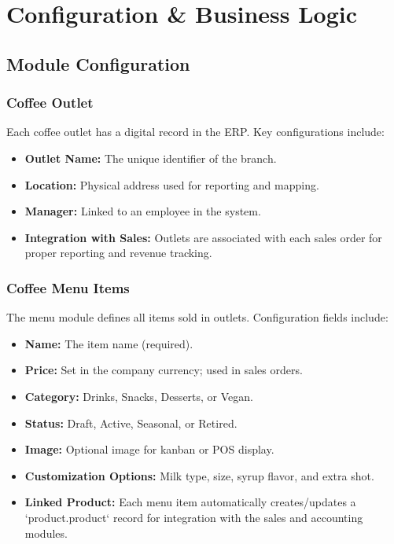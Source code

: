 \chapter{Configuration \& Business Logic}

\section*{Module Configuration}

\subsection*{Coffee Outlet}
Each coffee outlet has a digital record in the ERP. Key configurations include:
\begin{itemize}
    \item \textbf{Outlet Name:} The unique identifier of the branch.
    \item \textbf{Location:} Physical address used for reporting and mapping.
    \item \textbf{Manager:} Linked to an employee in the system.
    \item \textbf{Integration with Sales:} Outlets are associated with each sales order for proper reporting and revenue tracking.
\end{itemize}

\subsection*{Coffee Menu Items}
The menu module defines all items sold in outlets. Configuration fields include:
\begin{itemize}
    \item \textbf{Name:} The item name (required).
    \item \textbf{Price:} Set in the company currency; used in sales orders.
    \item \textbf{Category:} Drinks, Snacks, Desserts, or Vegan.
    \item \textbf{Status:} Draft, Active, Seasonal, or Retired.
    \item \textbf{Image:} Optional image for kanban or POS display.
    \item \textbf{Customization Options:} Milk type, size, syrup flavor, and extra shot.
    \item \textbf{Linked Product:} Each menu item automatically creates/updates a `product.product` record for integration with the sales and accounting modules.
\end{itemize}

